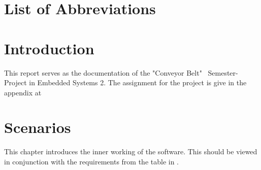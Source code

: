 \documentclass[a4paper,12pt,twoside]{scrreprt}
\begin{document}
\thispagestyle{empty}
\fancyfoot[C]{\thepage}%
\clearpage
{}
{}
\thispagestyle{empty}
\fancyfoot[C]{\thepage}%
\chapter*{List of Abbreviations}
\thispagestyle{empty}
\fancyfoot[C]{\thepage}%
\begin{acronym}[SQL]

\end{acronym}





\chapter{Introduction}
\label{chap:Introduction}
This report serves as the documentation of the "Conveyor Belt" \, Semester-Project in Embedded Systems 2. The assignment for the project is give in the appendix at 

\chapter{Scenarios}
This chapter introduces the inner working of the software. This should be viewed in conjunction with the requirements from the table in . 
\end{document}
